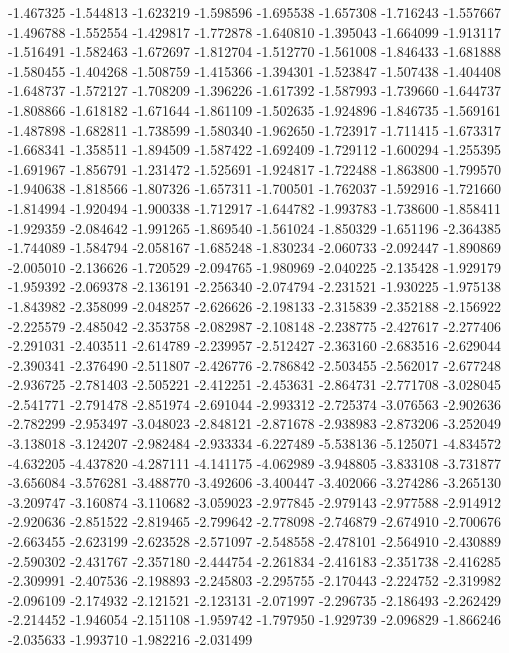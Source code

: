 -1.467325
-1.544813
-1.623219
-1.598596
-1.695538
-1.657308
-1.716243
-1.557667
-1.496788
-1.552554
-1.429817
-1.772878
-1.640810
-1.395043
-1.664099
-1.913117
-1.516491
-1.582463
-1.672697
-1.812704
-1.512770
-1.561008
-1.846433
-1.681888
-1.580455
-1.404268
-1.508759
-1.415366
-1.394301
-1.523847
-1.507438
-1.404408
-1.648737
-1.572127
-1.708209
-1.396226
-1.617392
-1.587993
-1.739660
-1.644737
-1.808866
-1.618182
-1.671644
-1.861109
-1.502635
-1.924896
-1.846735
-1.569161
-1.487898
-1.682811
-1.738599
-1.580340
-1.962650
-1.723917
-1.711415
-1.673317
-1.668341
-1.358511
-1.894509
-1.587422
-1.692409
-1.729112
-1.600294
-1.255395
-1.691967
-1.856791
-1.231472
-1.525691
-1.924817
-1.722488
-1.863800
-1.799570
-1.940638
-1.818566
-1.807326
-1.657311
-1.700501
-1.762037
-1.592916
-1.721660
-1.814994
-1.920494
-1.900338
-1.712917
-1.644782
-1.993783
-1.738600
-1.858411
-1.929359
-2.084642
-1.991265
-1.869540
-1.561024
-1.850329
-1.651196
-2.364385
-1.744089
-1.584794
-2.058167
-1.685248
-1.830234
-2.060733
-2.092447
-1.890869
-2.005010
-2.136626
-1.720529
-2.094765
-1.980969
-2.040225
-2.135428
-1.929179
-1.959392
-2.069378
-2.136191
-2.256340
-2.074794
-2.231521
-1.930225
-1.975138
-1.843982
-2.358099
-2.048257
-2.626626
-2.198133
-2.315839
-2.352188
-2.156922
-2.225579
-2.485042
-2.353758
-2.082987
-2.108148
-2.238775
-2.427617
-2.277406
-2.291031
-2.403511
-2.614789
-2.239957
-2.512427
-2.363160
-2.683516
-2.629044
-2.390341
-2.376490
-2.511807
-2.426776
-2.786842
-2.503455
-2.562017
-2.677248
-2.936725
-2.781403
-2.505221
-2.412251
-2.453631
-2.864731
-2.771708
-3.028045
-2.541771
-2.791478
-2.851974
-2.691044
-2.993312
-2.725374
-3.076563
-2.902636
-2.782299
-2.953497
-3.048023
-2.848121
-2.871678
-2.938983
-2.873206
-3.252049
-3.138018
-3.124207
-2.982484
-2.933334
-6.227489
-5.538136
-5.125071
-4.834572
-4.632205
-4.437820
-4.287111
-4.141175
-4.062989
-3.948805
-3.833108
-3.731877
-3.656084
-3.576281
-3.488770
-3.492606
-3.400447
-3.402066
-3.274286
-3.265130
-3.209747
-3.160874
-3.110682
-3.059023
-2.977845
-2.979143
-2.977588
-2.914912
-2.920636
-2.851522
-2.819465
-2.799642
-2.778098
-2.746879
-2.674910
-2.700676
-2.663455
-2.623199
-2.623528
-2.571097
-2.548558
-2.478101
-2.564910
-2.430889
-2.590302
-2.431767
-2.357180
-2.444754
-2.261834
-2.416183
-2.351738
-2.416285
-2.309991
-2.407536
-2.198893
-2.245803
-2.295755
-2.170443
-2.224752
-2.319982
-2.096109
-2.174932
-2.121521
-2.123131
-2.071997
-2.296735
-2.186493
-2.262429
-2.214452
-1.946054
-2.151108
-1.959742
-1.797950
-1.929739
-2.096829
-1.866246
-2.035633
-1.993710
-1.982216
-2.031499
